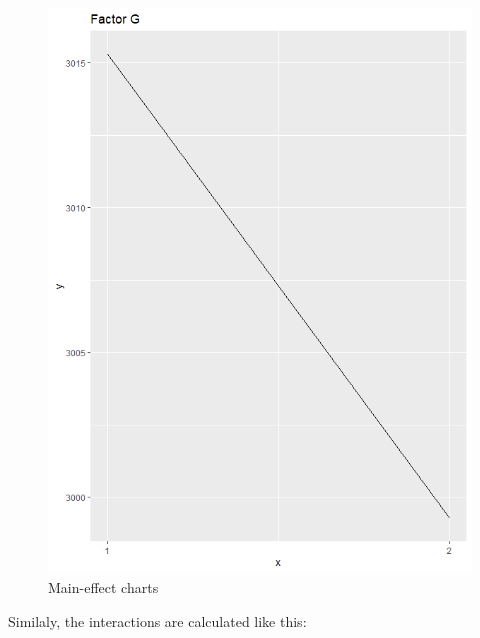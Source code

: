 \begin{figure}[H]
	\begin{minipage}[b]{0.33\linewidth}
		\centering
		\includegraphics[width=1\linewidth]{simulations/taguchi/plots/main_effect_g} 
	\end{minipage}
	\caption{Main-effect charts}
\end{figure}



Similaly, the interactions are calculated like this:


